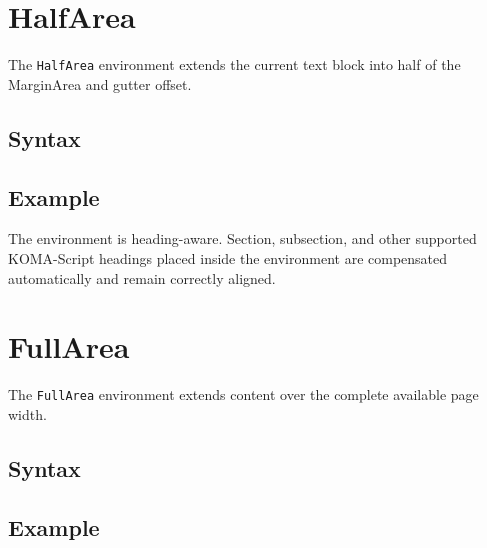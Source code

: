 \documentclass[
11pt,
a4paper,
oneside
]{scrbook}
\begin{document}
\section{HalfArea}

The \texttt{HalfArea} environment extends the current text block into half
of the MarginArea and gutter offset.

\subsection{Syntax}






\subsection{Example}

\begin{HalfArea}




\end{HalfArea}
The environment is heading-aware.
Section, subsection, and other supported KOMA-Script headings placed inside
the environment are compensated automatically and remain correctly aligned.

\section{FullArea}

The \texttt{FullArea} environment extends content over the complete available
page width.

\subsection{Syntax}






\subsection{Example}
\begin{FullArea}
	\begin{Center}
	\end{Center}
\end{FullArea}


\end{document}
